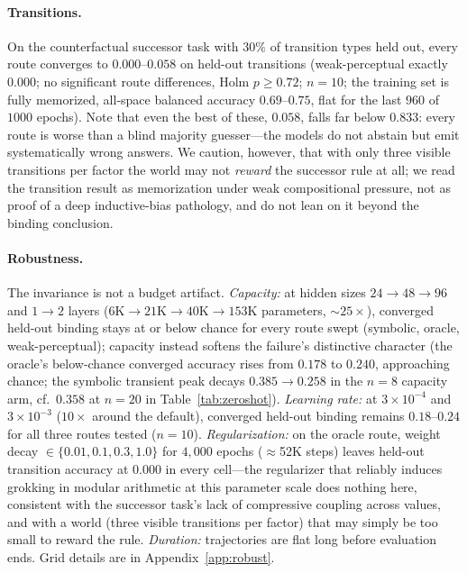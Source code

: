 \documentclass[10pt]{article} %
\begin{document}
\paragraph{Transitions.} On the counterfactual successor task with $30\%$ of transition types held
out, every route converges to $0.000$--$0.058$ on held-out transitions (weak-perceptual exactly
$0.000$; no significant route differences, Holm $p \ge 0.72$; $n{=}10$; the training set is fully
memorized, all-space balanced accuracy $0.69$--$0.75$, flat for the last $960$ of $1000$ epochs).
Note that even the best of these, $0.058$, falls far below $0.833$: every route is worse than a
blind majority guesser---the models do not abstain but emit systematically wrong answers. We
caution, however, that with only three visible transitions per factor the world may not
\emph{reward} the successor rule at all; we read the transition result as memorization under weak
compositional pressure, not as proof of a deep inductive-bias pathology, and do not lean on it
beyond the binding conclusion.

\paragraph{Robustness.} The invariance is not a budget artifact. \emph{Capacity:} at hidden sizes
$24\to48\to96$ and $1\to2$ layers ($6$K$\to$$21$K$\to$$40$K$\to$$153$K parameters, ${\sim}25\times$),
converged held-out binding stays at
or below chance for every route swept (symbolic, oracle, weak-perceptual); capacity instead
softens the failure's distinctive character (the oracle's below-chance converged accuracy rises
from $0.178$ to $0.240$, approaching chance; the symbolic transient peak decays $0.385 \to 0.258$
in the $n{=}8$ capacity arm, cf.\ $0.358$ at $n{=}20$ in Table~\ref{tab:zeroshot}).
\emph{Learning rate:} at $3\times10^{-4}$ and $3\times10^{-3}$ ($10\times$ around the default),
converged held-out binding remains $0.18$--$0.24$ for all three routes tested ($n{=}10$).
\emph{Regularization:} on the oracle route, weight decay $\in \{0.01, 0.1, 0.3, 1.0\}$ for
$4{,}000$ epochs ($\approx$52K steps) leaves held-out transition accuracy at $0.000$ in every
cell---the regularizer that reliably induces grokking in modular arithmetic at this parameter
scale does nothing here, consistent with the successor task's lack of compressive coupling across
values, and with a world (three visible transitions per factor) that may simply be too small to
reward the rule. \emph{Duration:} trajectories are flat long before evaluation ends. Grid details
are in Appendix~\ref{app:robust}.
\end{document}
